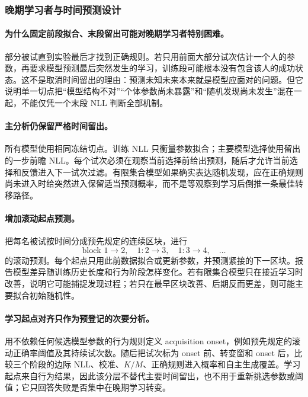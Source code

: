 \subsubsection{晚期学习者与时间预测设计}

\paragraph{为什么固定前段拟合、末段留出可能对晚期学习者特别困难。}
部分被试直到实验最后才找到正确规则。若只用前面大部分试次估计一个人的参数，再要求模型预测最后突然发生的学习，训练段可能根本没有包含该人的成功状态。这不是取消时间留出的理由：预测未知未来本来就是模型应面对的问题。但它说明单一切点把“模型结构不对”“个体参数尚未暴露”和“随机发现尚未发生”混在一起，不能仅凭一个末段 NLL 判断全部机制。

\paragraph{主分析仍保留严格时间留出。}
所有模型使用相同冻结切点。训练 NLL 只衡量参数拟合；主要模型选择使用留出的一步前瞻 NLL。每个试次必须在观察当前选择前给出预测，随后才允许当前选择和反馈进入下一试次过滤。有限集合模型如果确实表达随机发现，应在正确规则尚未进入时给突然进入保留适当预测概率，而不是等观察到学习后倒推一条最佳转移路径。

\paragraph{增加滚动起点预测。}
把每名被试按时间分成预先规定的连续区块，进行
\begin{equation}
    \text{block }1\rightarrow2,
    \quad
    1{:}2\rightarrow3,
    \quad
    1{:}3\rightarrow4,
    \quad\ldots
    \label{eq:model0804-rolling-origin}
\end{equation}
的滚动预测。每个起点只用此前数据拟合或更新参数，并预测紧接的下一区块。报告模型差异随训练历史长度和行为阶段怎样变化。若有限集合模型只在接近学习时改善，说明它可能捕捉发现过程；若只在最早区块改善、后期反而更差，则可能主要拟合初始随机性。

\paragraph{学习起点对齐只作为预登记的次要分析。}
用不依赖任何候选模型参数的行为规则定义 acquisition onset，例如预先规定的滚动正确率阈值及其持续试次数。随后把试次标为 onset 前、转变窗和 onset 后，比较三个阶段的边际 NLL、校准、$K/M$、正确规则进入概率和自主生成覆盖。学习起点来自行为结果，因此该分层不替代主要时间留出，也不用于重新挑选参数或阈值；它只回答失败是否集中在晚期学习转变。

